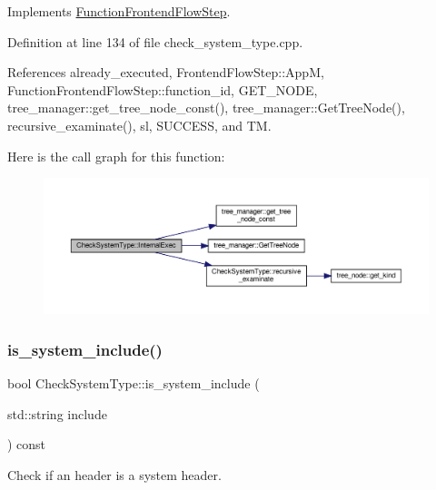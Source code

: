 Implements \hyperlink{classFunctionFrontendFlowStep_a00612f7fb9eabbbc8ee7e39d34e5ac68}{Function\+Frontend\+Flow\+Step}.



Definition at line 134 of file check\+\_\+system\+\_\+type.\+cpp.



References already\+\_\+executed, Frontend\+Flow\+Step\+::\+AppM, Function\+Frontend\+Flow\+Step\+::function\+\_\+id, G\+E\+T\+\_\+\+N\+O\+DE, tree\+\_\+manager\+::get\+\_\+tree\+\_\+node\+\_\+const(), tree\+\_\+manager\+::\+Get\+Tree\+Node(), recursive\+\_\+examinate(), sl, S\+U\+C\+C\+E\+SS, and TM.

Here is the call graph for this function\+:
\nopagebreak
\begin{figure}[H]
\begin{center}
\leavevmode
\includegraphics[width=350pt]{d9/df6/classCheckSystemType_ae3324caec3c8b0a2bc347b773670458f_cgraph}
\end{center}
\end{figure}
\mbox{\label{classCheckSystemType_aecaee42bfbe41b7524b51fee2e94f5e8}} 
\subsubsection{\texorpdfstring{is\+\_\+system\+\_\+include()}{is\_system\_include()}}
{\footnotesize\ttfamily bool Check\+System\+Type\+::is\+\_\+system\+\_\+include (\begin{DoxyParamCaption}\item[{std\+::string}]{include }\end{DoxyParamCaption}) const\hspace{0.3cm}{\ttfamily [private]}}



Check if an header is a system header. 


